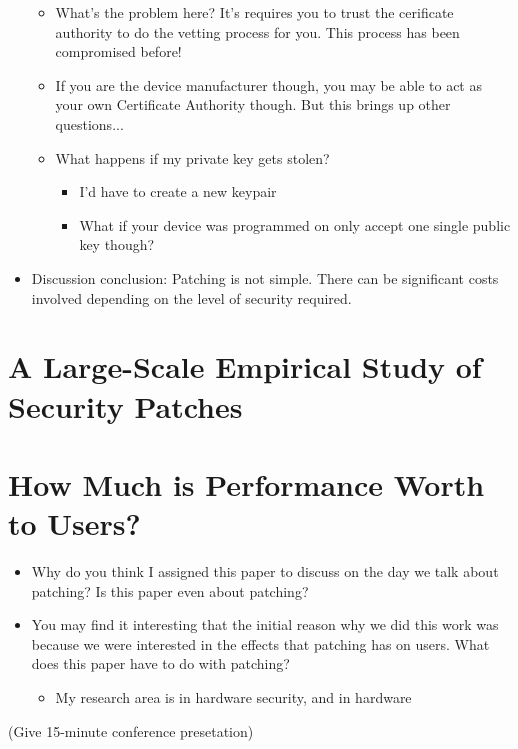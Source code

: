 \documentclass[11pt]{article}
\begin{document}
\begin{itemize}
\begin{itemize}
\begin{itemize}
        \end{itemize}
        \item What's the problem here? It's requires you to trust the cerificate authority to do the vetting process for you. This process has been compromised before!
        \item If you are the device manufacturer though, you may be able to act as your own Certificate Authority though. But this brings up other questions...
        \item What happens if my private key gets stolen?
        \begin{itemize}
            \item I'd have to create a new keypair
            \item What if your device was programmed on only accept one single public key though?
        \end{itemize}
    \end{itemize}
    \item Discussion conclusion: Patching is not simple. There can be significant costs involved depending on the level of security required. 
\end{itemize}

\section*{A Large-Scale Empirical Study of Security Patches}

\section*{How Much is Performance Worth to Users?}

\begin{itemize}
    \item Why do you think I assigned this paper to discuss on the day we talk about patching? Is this paper even about patching?
    \item You may find it interesting that the initial reason why we did this work was because we were interested in the effects that patching has on users. What does this paper have to do with patching?
    \begin{itemize}
        \item My research area is in hardware security, and in hardware 
    \end{itemize}
\end{itemize}

(Give 15-minute conference presetation)
\end{document}
